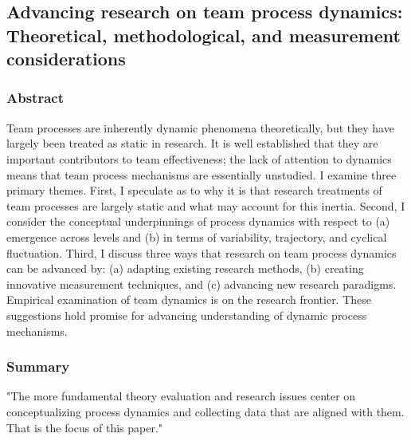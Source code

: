 \documentclass[12pt]{article}
\begin{document}

\subsection*{Advancing research on team process dynamics: Theoretical, methodological, and measurement considerations\cite{advancing_research}}

\subsubsection*{Abstract}
Team processes are inherently dynamic phenomena theoretically, but they have largely been treated as static in research. It is well established that they are important contributors to team effectiveness; the lack of attention to dynamics means that team process mechanisms are essentially unstudied. I examine three primary themes. First, I speculate as to why it is that research treatments of team processes are largely static and what may account for this inertia. Second, I consider the conceptual underpinnings of process dynamics with respect to (a) emergence across levels and (b) in terms of variability, trajectory, and cyclical fluctuation. Third, I discuss three ways that research on team process dynamics can be advanced by: (a) adapting existing research methods, (b) creating innovative measurement techniques, and (c) advancing new research paradigms. Empirical examination of team dynamics is on the research frontier. These suggestions hold promise for advancing understanding of dynamic process mechanisms.

\subsubsection*{Summary}

"The more fundamental theory evaluation and research issues center on conceptualizing process dynamics and collecting data that are aligned with them. That is the focus of this paper."
\end{document}
